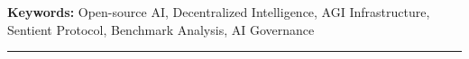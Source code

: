 \documentclass[10pt,a4paper]{article}
\begin{document}
\vspace{1em}

\noindent\textbf{Keywords:} Open-source AI, Decentralized Intelligence, AGI Infrastructure, Sentient Protocol, Benchmark Analysis, AI Governance

\vspace{1em}

\noindent\rule{\textwidth}{0.4pt}















\end{document}
